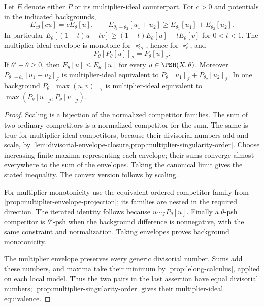 \begin{proposition}\label{prop:two-envelope-algebra}
Let $E$ denote either $P$ or its multiplier-ideal counterpart. For $c>0$ and potentials in the indicated backgrounds,
\[
 E_{c\theta}[cu]=cE_\theta[u],\qquad
 E_{\theta_1+\theta_2}[u_1+u_2]
                    \geq E_{\theta_1}[u_1]+E_{\theta_2}[u_2].
\]
In particular $E_\theta[(1-t)u+tv]\geq(1-t)E_\theta[u]+tE_\theta[v]$ for $0<t<1$. The multiplier-ideal envelope is monotone for $\preceq_{\mathcal I}$, hence for $\preceq$, and
\[
 P_\theta[P_\theta[u]]_{\mathcal I}=P_\theta[u]_{\mathcal I}.
\]
If $\theta'-\theta\geq0$, then $E_\theta[u]\leq E_{\theta'}[u]$ for every $u\in\PSH(X,\theta)$.
Moreover $P_{\theta_1+\theta_2}[u_1+u_2]_{\mathcal I}$ is multiplier-ideal equivalent to $P_{\theta_1}[u_1]_{\mathcal I}+P_{\theta_2}[u_2]_{\mathcal I}$. In one background $P_\theta[\max(u,v)]_{\mathcal I}$ is multiplier-ideal equivalent to $\max(P_\theta[u]_{\mathcal I},P_\theta[v]_{\mathcal I})$.
\end{proposition}
\begin{proof}
Scaling is a bijection of the normalized competitor families. The sum of two ordinary competitors is a normalized competitor for the sum. The same is true for multiplier-ideal competitors, because their divisorial numbers add and scale, by \cref{lem:divisorial-envelope-closure,prop:multiplier-singularity-order}. Choose increasing finite maxima representing each envelope; their sums converge almost everywhere to the sum of the envelopes. Taking the canonical limit gives the stated inequality. The convex version follows by scaling.

For multiplier monotonicity use the equivalent ordered competitor family from \cref{prop:multiplier-envelope-projection}; its families are nested in the required direction. The iterated identity follows because $u\sim_{\mathcal I}P_\theta[u]$. Finally a $\theta$-psh competitor is $\theta'$-psh when the background difference is nonnegative, with the same constraint and normalization. Taking envelopes proves background monotonicity.

The multiplier envelope preserves every generic divisorial number. Sums add these numbers, and maxima take their minimum by \cref{prop:lelong-calculus}, applied on each local model. Thus the two pairs in the last assertion have equal divisorial numbers; \cref{prop:multiplier-singularity-order} gives their multiplier-ideal equivalence.
\end{proof}

